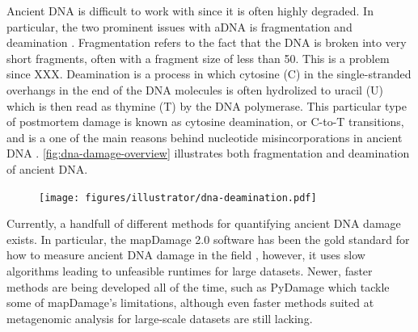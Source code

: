 Ancient DNA is difficult to work with since it is often highly degraded. In particular, the two prominent issues with aDNA is fragmentation and deamination \autocite{dabneyAncientDNADamage2013a,peyregnePresentDayDNAContamination2020,renaudAuthenticationAssessmentContamination2019}. Fragmentation refers to the fact that the DNA is broken into very short fragments, often with a fragment size of less than \SI{50}{\basepairs}. This is a problem since XXX.
Deamination is a process in which cytosine (C) in the single-stranded overhangs in the end of the DNA molecules is often hydrolized to uracil (U) which is then read as thymine (T) by the DNA polymerase. This particular type of postmortem damage is known as cytosine deamination, or C-to-T transitions, and is a one of the main reasons behind nucleotide misincorporations in ancient DNA \autocite{briggsPatternsDamageGenomic2007}. \autoref{fig:dna-damage-overview} illustrates both fragmentation and deamination of ancient DNA.

\begin{figure}[htbp]
    \centering
    \texttt{[image: figures/illustrator/dna-deamination.pdf]}
\end{figure}

Currently, a handfull of different methods for quantifying ancient DNA damage exists. In particular, the mapDamage 2.0 software has been the gold standard for how to measure ancient DNA damage in the field \autocite{jonssonMapDamage2FastApproximate2013}, however, it uses slow algorithms leading to unfeasible runtimes for large datasets. Newer, faster methods are being developed all of the time, such as PyDamage \autocite{borryPyDamageAutomatedAncient2021} which tackle some of mapDamage's limitations, although even faster methods suited at metagenomic analysis for large-scale datasets are still lacking.

